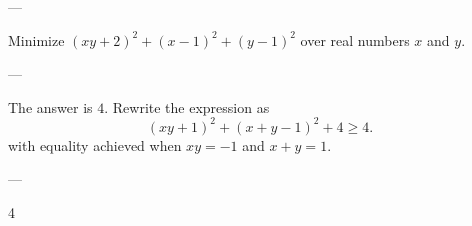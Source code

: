 
---

Minimize $(xy+2)^2+(x-1)^2+(y-1)^2$ over real numbers $x$ and $y$.

---

The answer is $4$. Rewrite the expression as \[(xy+1)^2+(x+y-1)^2+4\ge4.\]
with equality achieved when $xy=-1$ and $x+y=1$.

---

4
